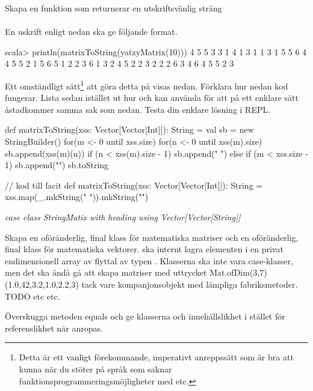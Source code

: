 \Subtask Skapa en funktion som returnerar en utskriftsvänlig sträng \\  \\ En uskrift enligt nedan ska ge följande format. 
\begin{REPL}
scala> println(matrixToString(yatzyMatrix(10)))
4 5 5 3 3
1 4 1 3 1
1 3 1 5 5
6 4 4 5 5
2 1 5 6 5
1 2 2 3 6
1 3 2 4 5
2 2 3 2 2
2 6 3 4 6
4 5 5 2 3

\end{REPL}
Ett omständligt sätt\footnote{Detta är ett vanligt förekommande, imperativt anreppssätt som är bra att kunna när du stöter på språk som saknar funktionsprogrammeringsmöjligheter med  etc.} att göra detta på visas nedan. Förklara hur nedan kod fungerar. Lista sedan istället ut hur  och  kan använda för att på ett enklare sätt åstadkommer samma sak som nedan. Testa din enklare lösning i REPL.
\begin{Code}
def matrixToString(xss: Vector[Vector[Int]]): String = {
  val sb = new StringBuilder()
  for(m <- 0 until xss.size) {
    for(n <- 0 until xss(m).size) { 
      sb.append(xss(m)(n))
      if (n < xss(m).size - 1) sb.append(" ") 
      else if (m < xss.size - 1) sb.append("\n")
    }
  }
  sb.toString
}
\end{Code}

 
\begin{Code}
// kod till facit
def matrixToString(xss: Vector[Vector[Int]]): String = 
  xss.map(_.mkString(" ")).mkString("\n")
\end{Code}





\Task \emph{case class StringMatix with heading using Vector[Vector[String]]}



\Task Skapa en oföränderlig, final klass  för matematiska matriser och en oföränderlig, final klass  för matematiska vektorer.  ska internt lagra elementen i en privat endimensionell array av flyttal av typen . Klasserna ska inte vara case-klasser, men det ska ändå gå att skapa matriser med uttrycket Mat.ofDim(3,7)(1.0,42,3.2,1.0,2.2,3) tack vare  kompanjonsobjekt med lämpliga fabriksmetoder. TODO etc etc.

\Subtask Överskugga metoden equals och ge klasserna  och  innehållslikhet i stället för referenslikhet när \code{==} anropas.

